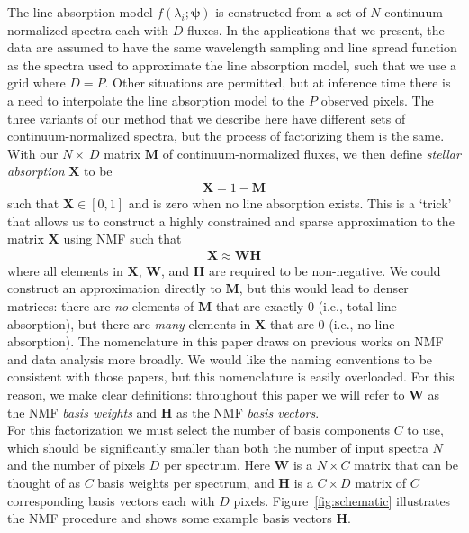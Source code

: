 \documentclass[modern]{aastex631}
\renewcommand{\vec}[1]{\mathbf{#1}}
\newcommand{\vecpsi}{\boldsymbol{\psi}}
\newcommand{\vecW}{\mathbf{W}}
\newcommand{\vecH}{\mathbf{H}}
\newcommand{\vecX}{\mathbf{X}}
\begin{document}
The line absorption model $f(\lambda_i;\vecpsi)$ is constructed from a set of $N$ continuum-normalized spectra each with $D$ fluxes. In the applications that we present, the data are assumed to have the same wavelength sampling and line spread function as the spectra used to approximate the line absorption model, such that we use a grid where $D = P$. Other situations are permitted, but at inference time there is a need to interpolate the line absorption model to the $P$ observed pixels. The three variants of our method that we describe here have different sets of continuum-normalized spectra, but the process of factorizing them is the same. With our $N \times\ D$ matrix $\vec{M}$ of continuum-normalized fluxes, we then define \emph{stellar absorption} $\vecX$ to be
\begin{align}
    \vecX = 1 - \vec{M}
\end{align}
such that $\vecX \in \left[0, 1\right]$ and is zero when no line absorption exists. This is a `trick' that allows us to construct a highly constrained and sparse approximation to the matrix $\vecX$ using NMF such that 
\begin{align}
    \vecX \approx \vec{W}\vec{H} \label{eq:nmf}
\end{align}
where all elements in $\vecX$, $\vec{W}$, and $\vec{H}$ are required to be non-negative. 
We could construct an approximation directly to $\vec{M}$, but this would lead to denser matrices: there are \emph{no} elements of $\vec{M}$ that are exactly 0 (i.e., total line absorption), but there are \emph{many} elements in $\vecX$ that are 0 (i.e., no line absorption). The nomenclature in this paper draws on previous works on NMF and data analysis more broadly. We would like the naming conventions to be consistent with those papers, but this nomenclature is easily overloaded. For this reason, we make clear definitions: throughout this paper we will refer to $\vecW$ as the NMF \emph{basis weights} and $\vecH$ as the NMF \emph{basis vectors}. \\

For this factorization we must select the number of basis components $C$ to use, which should be significantly smaller than both the number of input spectra $N$ and the number of pixels $D$ per spectrum. Here $\vec{W}$ is a $N \times C$ matrix that can be thought of as $C$ basis weights per spectrum, and $\vec{H}$ is a $C \times D$ matrix of $C$ corresponding basis vectors each with $D$ pixels. Figure~\ref{fig:schematic} illustrates the NMF procedure and shows some example basis vectors $\vec{H}$.\\
\end{document}
